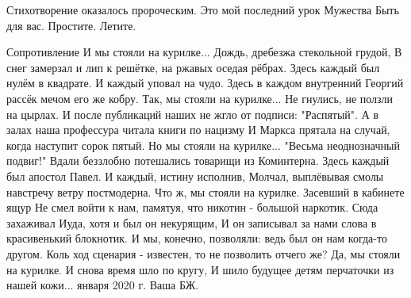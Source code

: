 Стихотворение оказалось пророческим. Это мой последний урок Мужества Быть для
вас. Простите. Летите. 

\obeycr
Сопротивление
\smallskip
И мы стояли на курилке... Дождь, дребезжа стекольной грудой,
В снег замерзал и лип к решётке, на ржавых оседая рёбрах.
Здесь каждый был нулём в квадрате. И каждый уповал на чудо.
Здесь в каждом внутренний Георгий рассёк мечом его же кобру.
\smallskip
Так, мы стояли на курилке... Не гнулись, не ползли на цырлах.
И после публикаций наших не жгло от подписи: "Распятый".
А в залах наша профессура читала книги по нацизму
И Маркса прятала на случай, когда наступит сорок пятый.
\smallskip
Но мы стояли на курилке... "Весьма неоднозначный подвиг!"
Вдали беззлобно потешались товарищи из Коминтерна.
Здесь каждый был апостол Павел. И каждый, истину исполнив,
Молчал, выплёвывая смолы навстречу ветру постмодерна.
\smallskip
Что ж, мы стояли на курилке. Засевший в кабинете ящур
Не смел войти к нам, памятуя, что никотин - большой наркотик.
Сюда захаживал Иуда, хотя и был он некурящим,
И он записывал за нами слова в красивенький блокнотик.
\smallskip
И мы, конечно, позволяли: ведь был он нам когда-то другом.
Коль ход сценария - известен, то не позволить отчего же?
Да, мы стояли на курилке. И снова время шло по кругу,
И шило будущее детям перчаточки из нашей кожи...
 января 2020 г.
\smallskip
Ваша БЖ.
\restorecr


